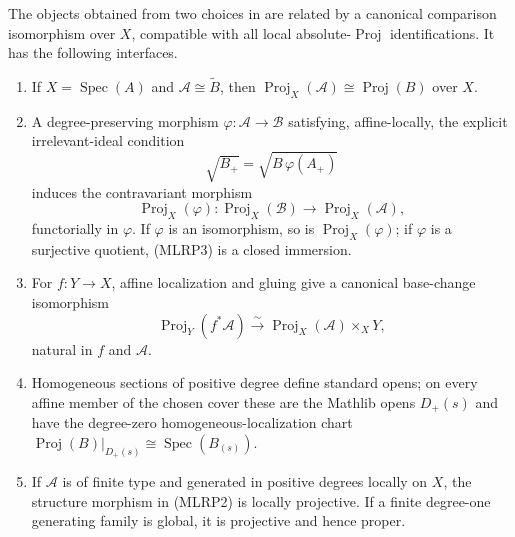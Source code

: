 \begin{lemma}
  \label{lemma:nagata-relative-proj-interface}

  The objects obtained from two choices in
   are related by a canonical comparison
  isomorphism over $X$, compatible with all local absolute-\(\operatorname{Proj}\)
  identifications.
  It has the following interfaces.
  \begin{enumerate}
    \item If $X=\operatorname{Spec}(A)$ and
      $\mathcal A\cong\widetilde B$, then
      $\operatorname{Proj}_X(\mathcal A)\cong\operatorname{Proj}(B)$ over
      $X$.
    \item A degree-preserving morphism
      $\varphi\colon\mathcal A\to\mathcal B$ satisfying, affine-locally,
      the explicit irrelevant-ideal condition
      \[
        \sqrt{B_+}=\sqrt{B\,\varphi(A_+)}
      \]
      induces the contravariant morphism
      \[
        \operatorname{Proj}_X(\varphi)\colon
        \operatorname{Proj}_X(\mathcal B)\longrightarrow
          \operatorname{Proj}_X(\mathcal A),                     \tag{MLRP3}
      \]
      functorially in $\varphi$.  If $\varphi$ is an isomorphism, so is
      $\operatorname{Proj}_X(\varphi)$; if $\varphi$ is a surjective
      quotient, (MLRP3) is a closed immersion.
    \item For $f\colon Y\to X$, affine localization and gluing give a
      canonical base-change isomorphism
      \[
        \operatorname{Proj}_Y(f^*\mathcal A)
          \xrightarrow{\sim}
        \operatorname{Proj}_X(\mathcal A)\times_XY,               \tag{MLRP4}
      \]
      natural in $f$ and $\mathcal A$.
    \item Homogeneous sections of positive degree define standard opens;
      on every affine member of the chosen cover these are the Mathlib opens
      $D_+(s)$ and have the degree-zero homogeneous-localization chart
      $\operatorname{Proj}(B)|_{D_+(s)}\cong\operatorname{Spec}(B_{(s)})$.
    \item If $\mathcal A$ is of finite type and generated in positive
      degrees locally on $X$, the structure morphism in (MLRP2) is locally
      projective.  If a finite degree-one generating family is global, it is
      projective and hence proper.
  \end{enumerate}
\end{lemma}

